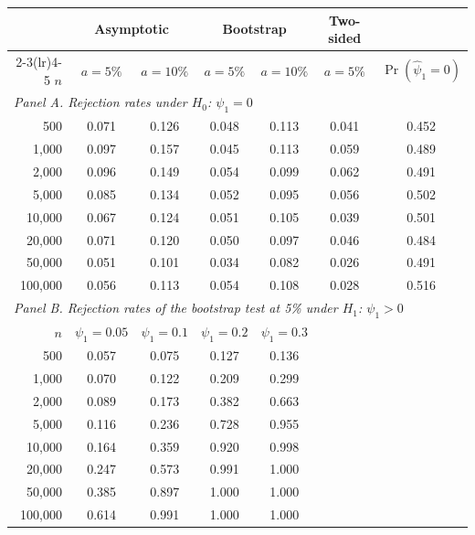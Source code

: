 \begin{tabular}{rcccccc}
\toprule
& \multicolumn{2}{c}{Asymptotic} & \multicolumn{2}{c}{Bootstrap} & Two-sided & \\
\cmidrule(lr){2-3}\cmidrule(lr){4-5}
$n$ & $a = 5\%$ & $a = 10\%$ & $a = 5\%$ & $a = 10\%$ & $a = 5\%$ & $\Pr(\hat\psi_1 = 0)$ \\
\midrule
\multicolumn{7}{l}{\textit{Panel A. Rejection rates under $H_0$: $\psi_1 = 0$}} \\
\midrule
500 & 0.071 & 0.126 & 0.048 & 0.113 & 0.041 & 0.452 \\
1{,}000 & 0.097 & 0.157 & 0.045 & 0.113 & 0.059 & 0.489 \\
2{,}000 & 0.096 & 0.149 & 0.054 & 0.099 & 0.062 & 0.491 \\
5{,}000 & 0.085 & 0.134 & 0.052 & 0.095 & 0.056 & 0.502 \\
10{,}000 & 0.067 & 0.124 & 0.051 & 0.105 & 0.039 & 0.501 \\
20{,}000 & 0.071 & 0.120 & 0.050 & 0.097 & 0.046 & 0.484 \\
50{,}000 & 0.051 & 0.101 & 0.034 & 0.082 & 0.026 & 0.491 \\
100{,}000 & 0.056 & 0.113 & 0.054 & 0.108 & 0.028 & 0.516 \\
\midrule
\multicolumn{7}{l}{\textit{Panel B. Rejection rates of the bootstrap test at 5\% under $H_1$: $\psi_1 > 0$}} \\
\midrule
$n$ & $\psi_1=0.05$ & $\psi_1=0.1$ & $\psi_1=0.2$ & $\psi_1=0.3$ & & \\
\midrule
500 & 0.057 & 0.075 & 0.127 & 0.136 & & \\
1{,}000 & 0.070 & 0.122 & 0.209 & 0.299 & & \\
2{,}000 & 0.089 & 0.173 & 0.382 & 0.663 & & \\
5{,}000 & 0.116 & 0.236 & 0.728 & 0.955 & & \\
10{,}000 & 0.164 & 0.359 & 0.920 & 0.998 & & \\
20{,}000 & 0.247 & 0.573 & 0.991 & 1.000 & & \\
50{,}000 & 0.385 & 0.897 & 1.000 & 1.000 & & \\
100{,}000 & 0.614 & 0.991 & 1.000 & 1.000 & & \\
\bottomrule
\end{tabular}
